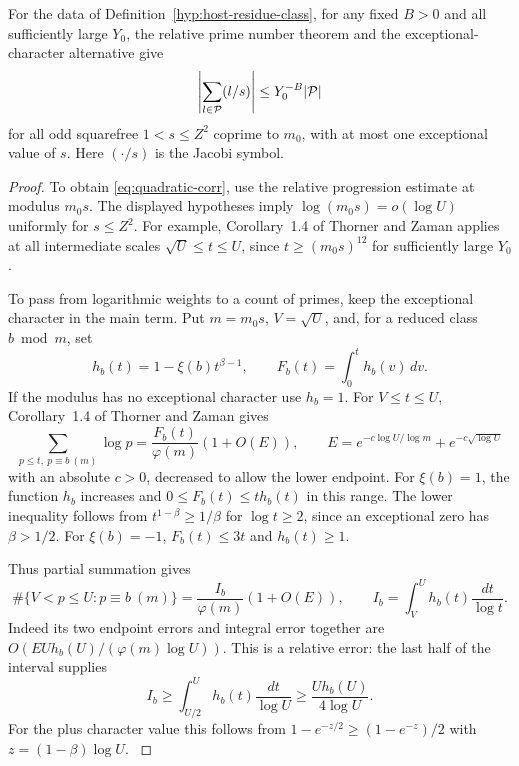 \begin{proposition}\label{prop:quadratic-host-correlation}
For the data of Definition~\ref{hyp:host-residue-class}, for any fixed \(B>0\)
and all sufficiently large \(Y_0\), the relative
prime number theorem and the exceptional-character alternative give
\begin{equation}\label{eq:quadratic-corr}
       \left|\sum_{l\in\mathcal P}(l/s)\right|
       \le Y_0^{-B}\lvert\mathcal P\rvert
\end{equation}
for all odd squarefree \(1<s\le Z^2\) coprime to \(m_0\), with at most
one exceptional value of \(s\). Here \((\cdot/s)\) is the Jacobi symbol.

\end{proposition}

\begin{proof}

To obtain \eqref{eq:quadratic-corr}, use the relative progression
estimate at modulus \(m_0s\). The displayed hypotheses imply
\(\log(m_0s)=o(\log U)\) uniformly for \(s\le Z^2\).
For example, Corollary~1.4 of Thorner and Zaman applies at all
intermediate scales \(\sqrt U\le t\le U\), since
\(t\ge(m_0s)^{12}\) for sufficiently large \(Y_0\).

To pass from logarithmic weights to a count of primes, keep the exceptional character in the main term. Put \(m=m_0s\), \(V=\sqrt U\), and, for a reduced class \(b\bmod m\), set
\[
 h_b(t)=1-\xi(b)t^{\beta-1},\qquad F_b(t)=\int_0^t h_b(v)\,dv .
\]
If the modulus has no exceptional character use \(h_b=1\). For \(V\le t\le U\), Corollary~1.4 of Thorner and Zaman gives
\[
 \sum_{p\le t,\ p\equiv b\ (m)}\log p
     =\frac{F_b(t)}{\varphi(m)}(1+O(E)),\qquad
 E=e^{-c\log U/\log m}+e^{-c\sqrt{\log U}}
\]
with an absolute \(c>0\), decreased to allow the lower endpoint.
For \(\xi(b)=1\), the function \(h_b\) increases and
\(0\le F_b(t)\le t h_b(t)\) in this range. The lower inequality follows from
\(t^{1-\beta}\ge1/\beta\) for \(\log t\ge2\), since an exceptional zero has \(\beta>1/2\).
For \(\xi(b)=-1\), \(F_b(t)\le3t\) and \(h_b(t)\ge1\).

Thus partial summation gives
\[
 \#\{V<p\le U:p\equiv b\ (m)\}
 =\frac{I_b}{\varphi(m)}(1+O(E)),\qquad
 I_b=\int_V^U h_b(t)\frac{dt}{\log t}.
\]
Indeed its two endpoint errors and integral error together are
\(O(EU h_b(U)/(\varphi(m)\log U))\). This is a relative error:
the last half of the interval supplies
\[
 I_b\ge \int_{U/2}^U h_b(t)\frac{dt}{\log U}
       \ge \frac{U h_b(U)}{4\log U}.
\]
For the plus character value this follows from
\(1-e^{-z/2}\ge(1-e^{-z})/2\) with \(z=(1-\beta)\log U\).
\cite[Corollary~1.4 and (1.7)]{thorner-zaman}


\end{proof}
